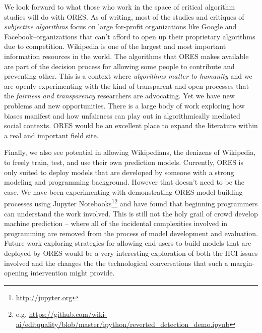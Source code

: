 We look forward to what those who work in the space of critical algorithm studies will do with ORES.  As of writing, most of the studies and critiques of \emph{subjective algorithms}\cite{tufekci2015algorithms} focus on large for-profit organizations like Google and Facebook--organizations that can't afford to open up their proprietary algorithms due to competition.  Wikipedia is one of the largest and most important information resources in the world.  The algorithms that ORES makes available are part of the decision process for allowing some people to contribute and preventing other.  This is a context where \emph{algorithms matter to humanity} and we are openly experimenting with the kind of transparent and open processes that the \emph{fairness and transparency} researchers are advocating.  Yet we have new problems and new opportunities.  There is a large body of work exploring how biases manifest and how unfairness can play out in algorithmically mediated social contexts.  ORES would be an excellent place to expand the literature within a real and important field site.

Finally, we also see potential in allowing Wikipedians, the denizens of Wikipedia, to freely train, test, and use their own prediction models.  Currently, ORES is only suited to deploy models that are developed by someone with a strong modeling and programming background.  However that doesn't need to be the case.  We have been experimenting with demonstrating ORES model building processes using Jupyter Notebooks\footnote{\url{http://jupyter.org}}\footnote{e.g. \url{ https://github.com/wiki-ai/editquality/blob/master/ipython/reverted_detection_demo.ipynb}} and have found that beginning programmers can understand the work involved.  This is still not the holy grail of crowd develop machine prediction -- where all of the incidental complexities involved in programming are removed from the process of model development and evaluation.  Future work exploring strategies for allowing end-users to build models that are deployed by ORES would be a very interesting exploration of both the HCI issues involved and the changes the the technological conversations that such a margin-opening intervention might provide.
